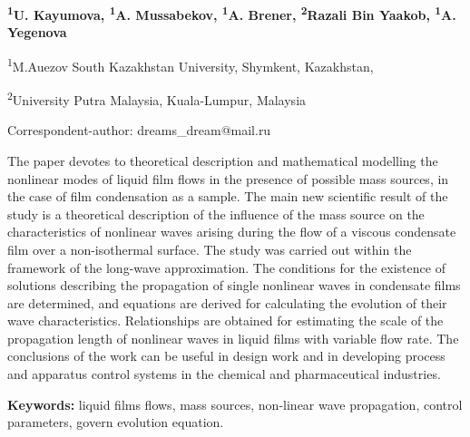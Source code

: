 
\begin{articleheader}

{\bfseries
\textsuperscript{1}U. Kayumova\textsuperscript{\envelope },
\textsuperscript{1}A. Mussabekov,
\textsuperscript{1}A. Brener,
\textsuperscript{2}Razali Bin Yaakob,
\textsuperscript{1}A. Yegenova
}
\end{articleheader}

\begin{affiliation}
\textsuperscript{1}M.Auezov South Kazakhstan University, Shymkent, Kazakhstan,

\textsuperscript{2}University Putra Malaysia, Kuala-Lumpur, Malaysia

\raggedright \textsuperscript{\envelope }Correspondent-author: dreams\_dream@mail.ru
\end{affiliation}

The paper devotes to theoretical description and mathematical modelling
the nonlinear modes of liquid film flows in the presence of possible
mass sources, in the case of film condensation as a sample. The main new
scientific result of the study is a theoretical description of the
influence of the mass source on the characteristics of nonlinear waves
arising during the flow of a viscous condensate film over a
non-isothermal surface. The study was carried out within the framework
of the long-wave approximation. The conditions for the existence of
solutions describing the propagation of single nonlinear waves in
condensate films are determined, and equations are derived for
calculating the evolution of their wave characteristics. Relationships
are obtained for estimating the scale of the propagation length of
nonlinear waves in liquid films with variable flow rate. The conclusions
of the work can be useful in design work and in developing process and
apparatus control systems in the chemical and pharmaceutical industries.

{\bfseries Keywords:} liquid films flows, mass sources, non-linear wave
propagation, control parameters, govern evolution equation.

